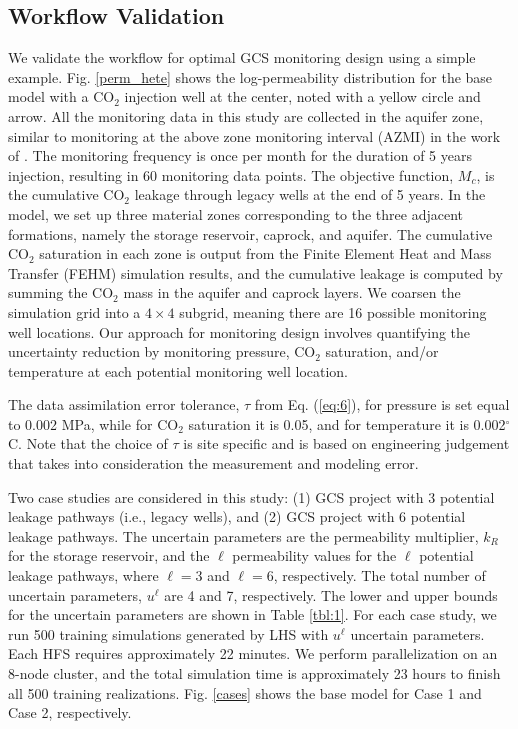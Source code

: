 \documentclass[a4paper,fleqn]{cas-sc}
\begin{document}
\subsection{Workflow Validation}
We validate the workflow for optimal GCS monitoring design using a simple example. Fig. \ref{perm_hete} shows the log-permeability distribution for the base model with a CO$_2$ injection well at the center, noted with a yellow circle and arrow. All the monitoring data in this study are collected in the aquifer zone, similar to monitoring at the above zone monitoring interval (AZMI) in the work of \citet{Sun2013}. The monitoring frequency is once per month for the duration of 5 years injection, resulting in 60 monitoring data points. The objective function, $M_c$, is the cumulative CO$_2$ leakage through legacy wells at the end of 5 years. In the model, we set up three material zones corresponding to the three adjacent formations, namely the storage reservoir, caprock, and aquifer. The cumulative CO$_2$ saturation in each zone is output from the Finite Element Heat and Mass Transfer (FEHM) \citep{Zyvoloski1997} simulation results, and the cumulative leakage is computed by summing the CO$_2$ mass in the aquifer and caprock layers. We coarsen the simulation grid into a $4\times 4$ subgrid, meaning there are 16 possible monitoring well locations. Our approach for monitoring design involves quantifying the uncertainty reduction by monitoring pressure, CO$_2$ saturation, and/or temperature at each potential monitoring well location. 

The data assimilation error tolerance, $\tau$ from Eq. (\ref{eq:6}), for pressure is set equal to 0.002 MPa, while for CO$_2$ saturation it is 0.05, and for temperature it is 0.002$^\circ$C. Note that the choice of $\tau$ is site specific and is based on engineering judgement that takes into consideration the measurement and modeling error.

Two case studies are considered in this study: (1) GCS project with 3 potential leakage pathways (i.e., legacy wells), and (2) GCS project with 6 potential leakage pathways. The uncertain parameters are the permeability multiplier, $k_R$ for the storage reservoir, and the $\ell$ permeability values for the $\ell$ potential leakage pathways, where $\ell=3$ and $\ell=6$, respectively. The total number of uncertain parameters, $u^\ell$ are 4 and 7, respectively. The lower and upper bounds for the uncertain parameters are shown in Table \ref{tbl:1}. For each case study, we run 500 training simulations generated by LHS with $u^\ell$ uncertain parameters. Each HFS requires approximately 22 minutes. We perform parallelization on an 8-node cluster, and the total simulation time is approximately 23 hours to finish all 500 training realizations. Fig. \ref{cases} shows the base model for Case 1 and Case 2, respectively.
\end{document}
